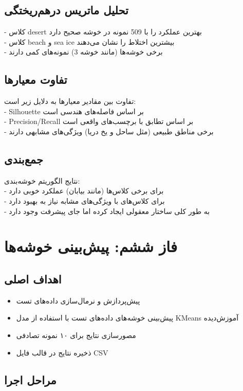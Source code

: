 \documentclass[a4paper,12pt]{article}
\let\nobreaksection\section
\renewcommand{\section}{\nobreaksection}  %
\begin{document}
	\subsection*{\textbf{تحلیل ماتریس درهم‌ریختگی}}
	- کلاس desert بهترین عملکرد را با 509 نمونه در خوشه صحیح دارد
	\\
	- کلاس beach و sea ice بیشترین اختلاط را نشان می‌دهند
	\\
	- برخی خوشه‌ها (مانند خوشه 3) نمونه‌های کمی دارند

	
	\subsection*{\textbf{تفاوت معیارها}}
	تفاوت بین مقادیر معیارها به دلایل زیر است:
	\\
	- Silhouette بر اساس فاصله‌های هندسی است
	\\
	- Precision/Recall بر اساس تطابق با برچسب‌های واقعی است
	\\
	- برخی مناطق طبیعی (مثل ساحل و یخ دریا) ویژگی‌های مشابهی دارند
	
	\subsection*{\textbf{جمع‌بندی}}
	نتایج الگوریتم خوشه‌بندی:
	\\
	- برای برخی کلاس‌ها (مانند بیابان) عملکرد خوبی دارد
	\\
	- برای کلاس‌های با ویژگی‌های مشابه نیاز به بهبود دارد
	\\
	- به طور کلی ساختار معقولی ایجاد کرده اما جای پیشرفت وجود دارد
	
	\section{فاز ششم: پیش‌بینی خوشه‌ها}
	
	\subsection{اهداف اصلی}
	\begin{itemize}
		\item پیش‌پردازش و نرمال‌سازی داده‌های تست
		\item پیش‌بینی خوشه‌های داده‌های تست با استفاده از مدل KMeans آموزش‌دیده
		\item مصورسازی نتایج برای ۱۰ نمونه تصادفی
		\item ذخیره نتایج در قالب فایل CSV
	\end{itemize}
	
	\subsection{مراحل اجرا}
	
\end{document}

